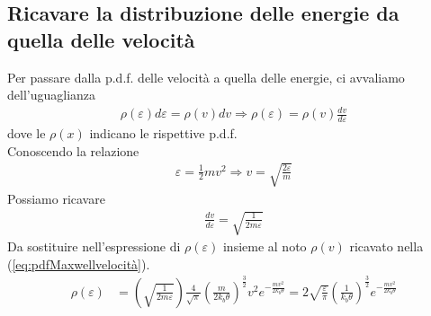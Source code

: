 \documentclass[
10pt, %
a4paper, %
oneside, %
headinclude,footinclude, %
BCOR5mm, %
]{scrartcl}
\begin{document}
\subsection{Ricavare la distribuzione delle energie da quella delle velocità}
Per passare dalla p.d.f. delle velocità a quella delle energie, ci avvaliamo dell'uguaglianza
\begin{align*} 
	\rho(\varepsilon)d\varepsilon = \rho(v)dv \Rightarrow \rho(\varepsilon) = \rho(v)\frac{dv}{d\varepsilon}
\end{align*} 
dove le $\rho(x)$ indicano le rispettive p.d.f.\\
Conoscendo la relazione
\begin{align*} 
	\varepsilon = \frac{1}{2}m v ^2 \Rightarrow v = \sqrt{\frac{2 \varepsilon}{m}}
\end{align*} 
Possiamo ricavare 
\begin{align*} 
	\frac{dv}{d\varepsilon} = \sqrt{\frac{1}{2 m \varepsilon}}
\end{align*} 
Da sostituire nell'espressione di $\rho(\varepsilon)$ insieme al noto $\rho(v)$ ricavato nella (\ref{eq:pdfMaxwellvelocità}).
\begin{align}\label{eq:distribuzione_energie}
	\rho(\varepsilon)&= \left(\sqrt{\frac{1}{2 m \varepsilon}}\right) \frac{4}{\sqrt{\pi}}\left(\frac{m}{2k_b\theta}\right)^{\frac{3}{2}} v^2 e^{-\frac{mv^2}{2 k_b \theta}}= 2 \sqrt{\frac{\varepsilon}{\pi}} \left(\frac{1}{k_b \theta}\right)^{\frac{3}{2}}e^{-\frac{mv^2}{2 k_b \theta}}
\end{align}  
\end{document}
